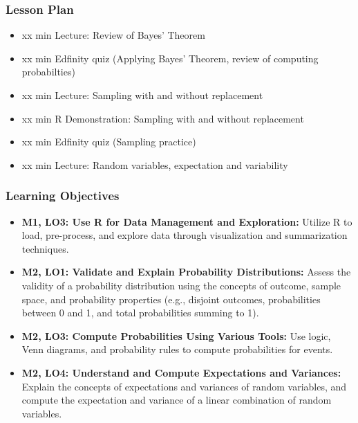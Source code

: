 \begin{frame}
    \frametitle{Lesson Plan}
    \begin{itemize}
        \item xx min Lecture: Review of Bayes' Theorem
        \item xx min Edfinity quiz (Applying Bayes' Theorem, review of computing probabilties)
        \item xx min Lecture: Sampling with and without replacement
        \item xx min R Demonstration: Sampling with and without replacement
        \item xx min Edfinity quiz (Sampling practice)
        \item xx min Lecture: Random variables, expectation and variability
    \end{itemize}
\end{frame}

\begin{frame}
    \frametitle{Learning Objectives}
    \begin{itemize}
        \item \textbf{M1, LO3: Use R for Data Management and Exploration:} Utilize R to load, pre-process, and explore data through visualization and summarization techniques.
        \item \textbf{M2, LO1: Validate and Explain Probability Distributions:} Assess the validity of a probability distribution using the concepts of outcome, sample space, and probability properties (e.g., disjoint outcomes, probabilities between 0 and 1, and total probabilities summing to 1).
        \item \textbf{M2, LO3: Compute Probabilities Using Various Tools:} Use logic, Venn diagrams, and probability rules to compute probabilities for events.
        \item \textbf{M2, LO4: Understand and Compute Expectations and Variances:} Explain the concepts of expectations and variances of random variables, and compute the expectation and variance of a linear combination of random variables.
    \end{itemize}
\end{frame}



